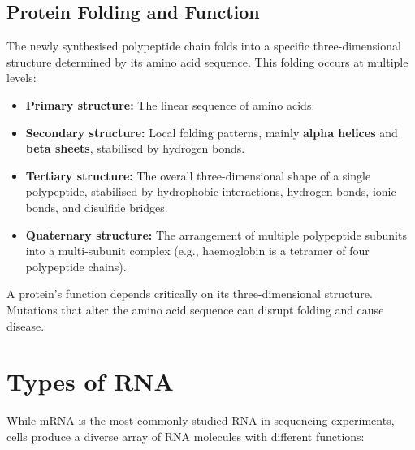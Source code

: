 \subsection{Protein Folding and Function}
\label{subsec:molbio:protein-folding}

The newly synthesised polypeptide chain folds into a specific three-dimensional structure determined by its amino acid sequence. This folding occurs at multiple levels:

\begin{itemize}[itemsep=2pt]
  \item \textbf{Primary structure:} The linear sequence of amino acids.
  \item \textbf{Secondary structure:} Local folding patterns, mainly \textbf{alpha helices} and \textbf{beta sheets}, stabilised by hydrogen bonds.
  \item \textbf{Tertiary structure:} The overall three-dimensional shape of a single polypeptide, stabilised by hydrophobic interactions, hydrogen bonds, ionic bonds, and disulfide bridges.
  \item \textbf{Quaternary structure:} The arrangement of multiple polypeptide subunits into a multi-subunit complex (e.g., haemoglobin is a tetramer of four polypeptide chains).
\end{itemize}

A protein's function depends critically on its three-dimensional structure. Mutations that alter the amino acid sequence can disrupt folding and cause disease.


\section{Types of RNA}
\label{sec:molbio:rna-types}

While mRNA is the most commonly studied RNA in sequencing experiments, cells produce a diverse array of RNA molecules with different functions:

